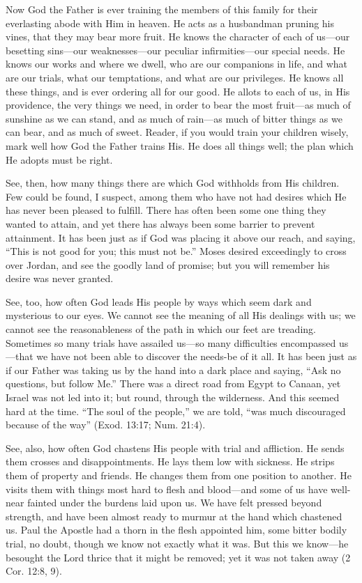 \documentclass[
]{book}
\begin{document}
Now God the Father is ever training the members of this family for their everlasting abode with Him in heaven. He acts as a husbandman pruning his vines, that they may bear more fruit. He knows the character of each of us---our besetting sins---our weaknesses---our peculiar infirmities---our special needs. He knows our works and where we dwell, who are our companions in life, and what are our trials, what our temptations, and what are our privileges. He knows all these things, and is ever ordering all for our good. He allots to each of us, in His providence, the very things we need, in order to bear the most fruit---as much of sunshine as we can stand, and as much of rain---as much of bitter things as we can bear, and as much of sweet. Reader, if you would train your children wisely, mark well how God the Father trains His. He does all things well; the plan which He adopts must be right.

See, then, how many things there are which God withholds from His children. Few could be found, I suspect, among them who have not had desires which He has never been pleased to fulfill. There has often been some one thing they wanted to attain, and yet there has always been some barrier to prevent attainment. It has been just as if God was placing it above our reach, and saying, ``This is not good for you; this must not be.'' Moses desired exceedingly to cross over Jordan, and see the goodly land of promise; but you will remember his desire was never granted.

See, too, how often God leads His people by ways which seem dark and mysterious to our eyes. We cannot see the meaning of all His dealings with us; we cannot see the reasonableness of the path in which our feet are treading. Sometimes so many trials have assailed us---so many difficulties encompassed us---that we have not been able to discover the needs-be of it all. It has been just as if our Father was taking us by the hand into a dark place and saying, ``Ask no questions, but follow Me.'' There was a direct road from Egypt to Canaan, yet Israel was not led into it; but round, through the wilderness. And this seemed hard at the time. ``The soul of the people,'' we are told, ``was much discouraged because of the way'' (Exod. 13:17; Num. 21:4).

See, also, how often God chastens His people with trial and affliction. He sends them crosses and disappointments. He lays them low with sickness. He strips them of property and friends. He changes them from one position to another. He visits them with things most hard to flesh and blood---and some of us have well-near fainted under the burdens laid upon us. We have felt pressed beyond strength, and have been almost ready to murmur at the hand which chastened us. Paul the Apostle had a thorn in the flesh appointed him, some bitter bodily trial, no doubt, though we know not exactly what it was. But this we know---he besought the Lord thrice that it might be removed; yet it was not taken away (2 Cor. 12:8, 9).
\end{document}
